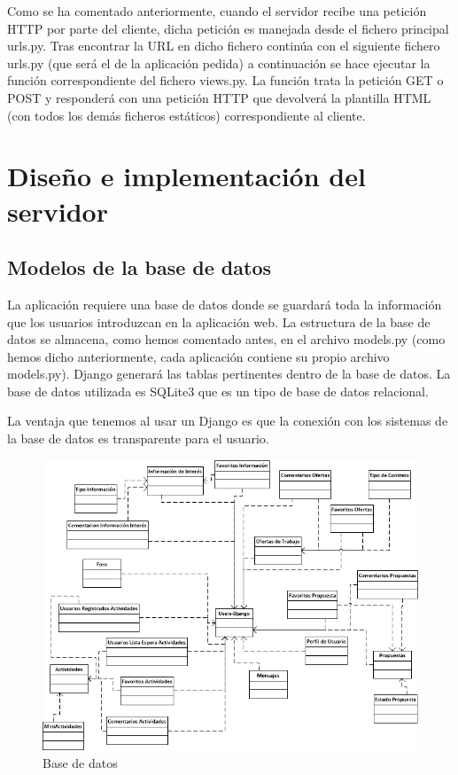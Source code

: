 Como se ha comentado anteriormente, cuando el servidor recibe una petición HTTP por parte del cliente, dicha petición es manejada desde el fichero principal urls.py. Tras encontrar la URL en dicho fichero continúa con el siguiente fichero urls.py (que será el de la aplicación pedida) a continuación se hace ejecutar la función correspondiente del fichero views.py. La función trata la petición GET o POST y responderá con una petición HTTP que devolverá la plantilla HTML (con todos los demás ficheros estáticos) correspondiente al cliente.


\section{Diseño e implementación del servidor} 
\label{sec:servidor}


\subsection{Modelos de la base de datos} 
\label{subsec:modelos}


La aplicación requiere una base de datos donde se guardará toda la información que los usuarios introduzcan en la aplicación web. La estructura de la base de datos se almacena, como hemos comentado antes, en el archivo models.py (como hemos dicho anteriormente, cada aplicación contiene su propio archivo models.py). Django generará las tablas pertinentes dentro de la base de datos. La base de datos utilizada es SQLite3 que es un tipo de base de datos relacional.


La ventaja que tenemos al usar un Django es que la conexión con los sistemas de la base de datos es transparente para el usuario. 

 \begin{figure}[H]
    \centering
    \includegraphics[width=12cm]{img/bbdd}
    \caption{Base de datos}
    \label{figura:base_datos}
 \end{figure}

